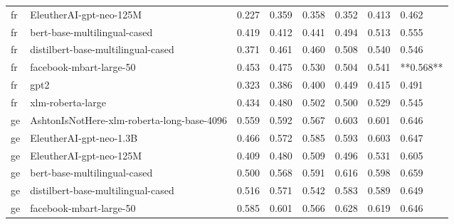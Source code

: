 \begin{tabular}{llllllll}
      fr &                    EleutherAI-gpt-neo-125M & 0.227 &                     0.359 &                 0.358 &                  0.352 &                                   0.413 &     0.462 \\
      fr &               bert-base-multilingual-cased & 0.419 &                     0.412 &                 0.441 &                  0.494 &                                   0.513 &     0.555 \\
      fr &         distilbert-base-multilingual-cased & 0.371 &                     0.461 &                 0.460 &                  0.508 &                                   0.540 &     0.546 \\
      fr &                    facebook-mbart-large-50 & 0.453 &                     0.475 &                 0.530 &                  0.504 &                                   0.541 & **0.568** \\
      fr &                                       gpt2 & 0.323 &                     0.386 &                 0.400 &                  0.449 &                                   0.415 &     0.491 \\
      fr &                          xlm-roberta-large & 0.434 &                     0.480 &                 0.502 &                  0.500 &                                   0.529 &     0.545 \\
      ge & AshtonIsNotHere-xlm-roberta-long-base-4096 & 0.559 &                     0.592 &                 0.567 &                  0.603 &                                   0.601 &     0.646 \\
      ge &                    EleutherAI-gpt-neo-1.3B & 0.466 &                     0.572 &                 0.585 &                  0.593 &                                   0.603 &     0.647 \\
      ge &                    EleutherAI-gpt-neo-125M & 0.409 &                     0.480 &                 0.509 &                  0.496 &                                   0.531 &     0.605 \\
      ge &               bert-base-multilingual-cased & 0.500 &                     0.568 &                 0.591 &                  0.616 &                                   0.598 &     0.659 \\
      ge &         distilbert-base-multilingual-cased & 0.516 &                     0.571 &                 0.542 &                  0.583 &                                   0.589 &     0.649 \\
      ge &                    facebook-mbart-large-50 & 0.585 &                     0.601 &                 0.566 &                  0.628 &                                   0.619 &     0.646 \\

\end{tabular}

